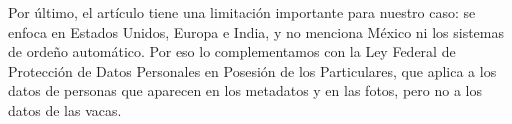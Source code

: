 Por último, el artículo tiene una limitación importante para nuestro caso: se enfoca en Estados Unidos, Europa e India, y no menciona México ni los sistemas de ordeño automático. Por eso lo complementamos con la Ley Federal de Protección de Datos Personales en Posesión de los Particulares, que aplica a los datos de personas que aparecen en los metadatos y en las fotos, pero no a los datos de las vacas.

\nocite{barton2025}
